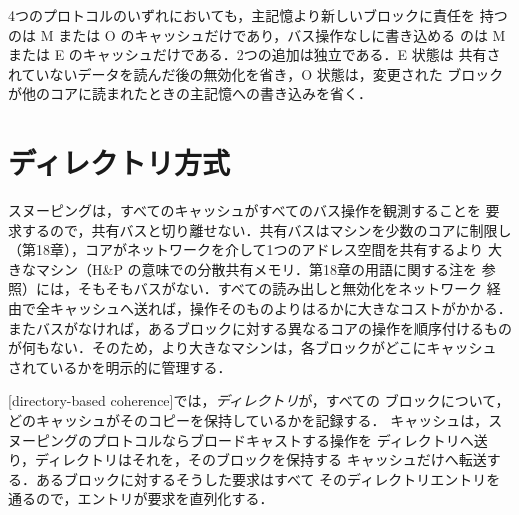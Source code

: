 \documentclass[../main.tex]{subfiles}
\begin{document}
\begin{keypoint}
  4つのプロトコルのいずれにおいても，主記憶より新しいブロックに責任を
  持つのは M または O のキャッシュだけであり，バス操作なしに書き込める
  のは M または E のキャッシュだけである．2つの追加は独立である．E 状態は
  共有されていないデータを読んだ後の無効化を省き，O 状態は，変更された
  ブロックが他のコアに読まれたときの主記憶への書き込みを省く．
\end{keypoint}

\section{ディレクトリ方式}
\label{sec:l19-directory}

スヌーピングは，すべてのキャッシュがすべてのバス操作を観測することを
要求するので，共有バスと切り離せない．共有バスはマシンを少数のコアに制限し
（第18章），コアがネットワークを介して1つのアドレス空間を共有するより
大きなマシン（H\&P の意味での分散共有メモリ．第18章の用語に関する注を
参照）には，そもそもバスがない．すべての読み出しと無効化をネットワーク
経由で全キャッシュへ送れば，操作そのものよりはるかに大きなコストがかかる．
またバスがなければ，あるブロックに対する異なるコアの操作を順序付けるもの
が何もない．そのため，より大きなマシンは，各ブロックがどこにキャッシュ
されているかを明示的に管理する．

\begin{definition}[ディレクトリ方式]
  [directory-based coherence]では，\emph{ディレクトリ}が，すべての
  ブロックについて，どのキャッシュがそのコピーを保持しているかを記録する．
  キャッシュは，スヌーピングのプロトコルならブロードキャストする操作を
  ディレクトリへ送り，ディレクトリはそれを，そのブロックを保持する
  キャッシュだけへ転送する．あるブロックに対するそうした要求はすべて
  そのディレクトリエントリを通るので，エントリが要求を直列化する．
\end{definition}
\end{document}
